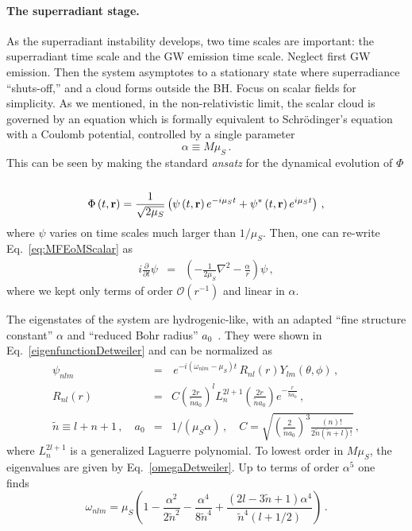 \documentclass[11pt]{article}
\newcommand{\be}{\begin{equation}}
\newcommand{\ee}{\end{equation}}
\def\beq{\begin{eqnarray}}
\def\eeq{\end{eqnarray}}
\numberwithin{equation}{section} %
\begin{document}
\paragraph{The superradiant stage.}
As the superradiant instability develops, two time scales are important: the superradiant time scale and the GW emission time scale. Neglect first GW emission. Then the system asymptotes to a stationary state where superradiance ``shuts-off,'' and a cloud forms outside the BH. Focus on scalar fields for simplicity. As we mentioned, in the non-relativistic limit, the scalar cloud is governed by an equation which is formally equivalent to Schr\"{o}dinger's equation with a Coulomb potential, controlled by a single parameter
%
\be
\alpha\equiv M\mu_S \, .
\ee
%
This can be seen by making the standard \textit{ansatz} for the dynamical evolution of $\Phi$~\cite{Mendes:2016vdr,Baumann:2018vus}
%
\beq
\Phi\left(t,\bf{r}\right)=\frac{1}{\sqrt{2\mu_S}}\left(\psi\left(t,\bf{r}\right)e^{-i\mu_S t}+\psi^*\left(t,\bf{r}\right)e^{i\mu_S t}\right)\,,
\eeq
%
where $\psi$ varies on time scales much larger than $1/\mu_S$. Then, one can re-write Eq.~\eqref{eq:MFEoMScalar} as
%
\beq
i \frac{\partial}{\partial t}\psi&=&\left(-\frac{1}{2\mu_S}\nabla^2-\frac{\alpha}{r}\right)\psi \, ,
\eeq
%
where we kept only terms of order $\mathcal{O}\left(r^{-1}\right)$ and linear in $\alpha$.

The eigenstates of the system are hydrogenic-like, with an adapted ``fine structure constant'' $\alpha$ and ``reduced Bohr radius'' $a_0$~\cite{Detweiler:1980uk,Arvanitaki:2010sy,Baumann:2018vus}. They were shown in Eq.~\eqref{eigenfunctionDetweiler} and can be normalized as
%
\beq
\psi_{nlm}&=&\,e^{-i\left(\omega_{nlm}-\mu_S\right)t}\,R_{nl}\left(r\right)Y_{lm}\left(\theta,\phi\right) \, ,\\
%
R_{nl}\left(r\right)&=&C\left(\frac{2r}{\tilde{n} a_0}\right)^lL_{n}^{2l+1}\left(\frac{2r}{\tilde{n}a_0}\right)e^{-\frac{r}{\tilde{n}a_0}} \, , \nonumber\\
%
\tilde{n}\equiv l+n+1\,,\quad a_0&=&1/\left(\mu_S\alpha\right) \, ,\quad C=\sqrt{\left(\frac{2}{\tilde{n}a_0}\right)^3\frac{\left(n\right)!}{2\tilde{n}\left(\tilde{n}+l\right)!}} \,,\label{eq:FrequencySpec}
\eeq
%
where $L_{n}^{2l+1}$ is a generalized Laguerre polynomial. To lowest order in $M\mu_S$, the eigenvalues are given by Eq.~\eqref{omegaDetweiler}. Up to terms of order $\alpha^5$ one finds~\cite{Baumann:2019eav}
%
\be
\omega_{nlm}=\mu_S\left(1-\frac{\alpha^2}{2\tilde{n}^2}-\frac{\alpha^4}{8\tilde{n}^4}+\frac{\left(2l-3\tilde{n}+1\right)\alpha^4}{\tilde{n}^4\left(l+1/2\right)}\right)\,.
\ee
%
\end{document}
